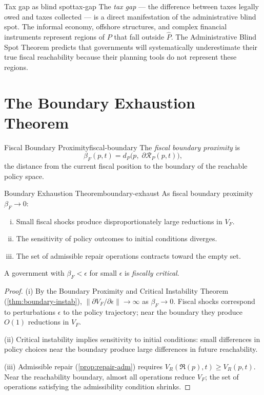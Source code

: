 \documentclass[12pt,twoside,openright]{book}
\newcommand{\reach}{\mathcal{R}}
\newcommand{\repair}{\mathfrak{R}}
\begin{document}
\begin{remark}{Tax gap as blind spot}{tax-gap}
  The \emph{tax gap} — the difference between taxes
  legally owed and taxes collected — is a direct
  manifestation of the administrative blind spot.
  The informal economy, offshore structures, and
  complex financial instruments represent regions of
  $P$ that fall outside $\hat{P}$.
  The Administrative Blind Spot Theorem predicts that
  governments will systematically underestimate their
  true fiscal reachability because their planning
  tools do not represent these regions.
\end{remark}

\section{The Boundary Exhaustion Theorem}

\begin{definition}{Fiscal Boundary Proximity}{fiscal-boundary}
  The \emph{fiscal boundary proximity} is
  \[
    \beta_F(p, t)
    = d_P\!\bigl(p,\; \partial\reach_P(p,t)\bigr),
  \]
  the distance from the current fiscal position to
  the boundary of the reachable policy space.
\end{definition}

\begin{theorem}{Boundary Exhaustion Theorem}{boundary-exhaust}
  As fiscal boundary proximity $\beta_F \to 0$:
  \begin{enumerate}[(i)]
    \item Small fiscal shocks produce disproportionately
          large reductions in $V_F$.
    \item The sensitivity of policy outcomes to initial
          conditions diverges.
    \item The set of admissible repair operations
          contracts toward the empty set.
  \end{enumerate}
  A government with $\beta_F < \epsilon$ for small
  $\epsilon$ is \emph{fiscally critical}.
\end{theorem}

\begin{proof}
  (i) By the Boundary Proximity and Critical Instability
  Theorem (\cref{thm:boundary-instab}),
  $\|\partial V_F/\partial\epsilon\| \to \infty$
  as $\beta_F \to 0$.
  Fiscal shocks correspond to perturbations $\epsilon$
  to the policy trajectory; near the boundary they
  produce $O(1)$ reductions in $V_F$.

  (ii) Critical instability implies sensitivity to
  initial conditions: small differences in policy
  choices near the boundary produce large differences
  in future reachability.

  (iii) Admissible repair (\cref{prop:repair-adm})
  requires $V_R(\repair(p), t) \ge V_R(p, t)$.
  Near the reachability boundary, almost all operations
  reduce $V_F$; the set of operations satisfying the
  admissibility condition shrinks.
\end{proof}
\end{document}
